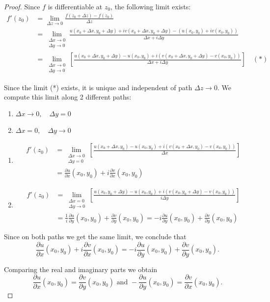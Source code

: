     \begin{proof} Since $f$ is differentiable at $z_0$, the following limit exists:
    \begin{align*}
         f'(z_0) & = \lim_{\Delta z \to 0} \frac{f(z_0 + \Delta z) - f(z_0)}{\Delta z} \\ 
        & = \lim_{\substack{\Delta x \to 0 \\ \Delta y \to 0}} \frac{u(x_0 + \Delta x, y_0 + \Delta y) + iv(x_0 + \Delta x, y_0 + \Delta y) - (u(x_0, y_0) + iv(x_0, y_0))}{\Delta x + i\Delta y} \\
     & = \lim_{\substack{\Delta x \to 0 \\ \Delta y \to 0}} \left[ \frac{u(x_0 + \Delta x, y_0 + \Delta y) - u(x_0, y_0) + i(v(x_0 + \Delta x, y_0 + \Delta y) - v(x_0, y_0))}{\Delta x + i\Delta y} \right] \quad (*) 
    \end{align*}
    
    Since the limit (*) exists, it is unique and independent of path $\Delta z \to 0$. We compute this limit along 2 different paths:
    \begin{enumerate}
        \item  $\Delta x \to 0, \quad  \Delta y = 0$
    \item $\Delta x = 0, \quad \Delta y \to 0$
\end{enumerate}
 \begin{enumerate}
    \item       \begin{align*} 
            f'(z_0) &= \lim_{\substack{\Delta x \to 0 \\ \Delta y = 0}} \left[ \frac{u(x_0 + \Delta x, y_0) - u(x_0, y_0) + i(v(x_0 + \Delta x, y_0) - v(x_0, y_0))}{\Delta x} \right] \\ 
            & = \frac{\partial u}{\partial x}(x_0, y_0) + i\frac{\partial v}{\partial x}(x_0, y_0) 
        \end{align*}
       \item \begin{align*} 
            f'(z_0) & = \lim_{\substack{\Delta x = 0 \\ \Delta y \to 0}} \left[ \frac{u(x_0, y_0 + \Delta y) - u(x_0, y_0) + i(v(x_0, y_0 + \Delta y) - v(x_0, y_0))}{i\Delta y} \right] \\ 
            & = \frac{1}{i}\frac{\partial u}{\partial y}(x_0, y_0) + \frac{\partial v}{\partial y}(x_0, y_0) = -i\frac{\partial u}{\partial y}(x_0, y_0) + \frac{\partial v}{\partial y}(x_0, y_0)
        \end{align*}
    \end{enumerate}
    Since on both paths we get the same limit, we conclude that
    \[ \frac{\partial u}{\partial x}(x_0, y_0) + i\frac{\partial v}{\partial x}(x_0, y_0) = -i\frac{\partial u}{\partial y}(x_0, y_0) + \frac{\partial v}{\partial y}(x_0, y_0).\]
    
    Comparing the real and imaginary parts we obtain 
    \[ \frac{\partial u}{\partial x}(x_0, y_0) = \frac{\partial v}{\partial y}(x_0, y_0) \text{ and }  -\frac{\partial u}{\partial y}(x_0, y_0) = \frac{\partial v}{\partial x}(x_0, y_0).\]
    \end{proof}


